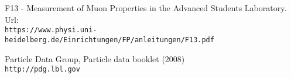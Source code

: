 
	


	

	\maketitle
	
	
	
	
	
	
	
	
	
	\begin{thebibliography}{9}
		F13 - Measurement of Muon Properties in the Advanced Students Laboratory. Url: \\\texttt{https://www.physi.uni-heidelberg.de/Einrichtungen/FP/anleitungen/F13.pdf}
		
	     Particle Data Group, Particle data booklet (2008)
		\\\texttt{http://pdg.lbl.gov}
	\end{thebibliography}
	
	
